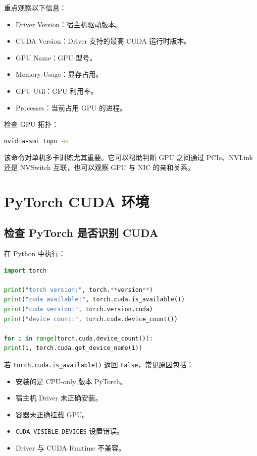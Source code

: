 重点观察以下信息：

\begin{itemize}
\item Driver Version：宿主机驱动版本。
\item CUDA Version：Driver 支持的最高 CUDA 运行时版本。
\item GPU Name：GPU 型号。
\item Memory-Usage：显存占用。
\item GPU-Util：GPU 利用率。
\item Processes：当前占用 GPU 的进程。
\end{itemize}

检查 GPU 拓扑：

\begin{lstlisting}[language=bash,caption={检查 GPU 拓扑},label={lst:nvidia-smi-topo}]
nvidia-smi topo -m
\end{lstlisting}

该命令对单机多卡训练尤其重要。它可以帮助判断 GPU 之间通过 PCIe、NVLink 还是 NVSwitch 互联，也可以观察 GPU 与 NIC 的亲和关系。

\section{PyTorch CUDA 环境}

\subsection{检查 PyTorch 是否识别 CUDA}

在 Python 中执行：

\begin{lstlisting}[language=Python,caption={检查 PyTorch CUDA 可用性},label={lst:pytorch-cuda-check}]
import torch

print("torch version:", torch.**version**)
print("cuda available:", torch.cuda.is_available())
print("cuda version:", torch.version.cuda)
print("device count:", torch.cuda.device_count())

for i in range(torch.cuda.device_count()):
print(i, torch.cuda.get_device_name(i))
\end{lstlisting}

若 \texttt{torch.cuda.is_available()} 返回 \texttt{False}，常见原因包括：

\begin{itemize}
\item 安装的是 CPU-only 版本 PyTorch。
\item 宿主机 Driver 未正确安装。
\item 容器未正确挂载 GPU。
\item \texttt{CUDA_VISIBLE_DEVICES} 设置错误。
\item Driver 与 CUDA Runtime 不兼容。
\end{itemize}

